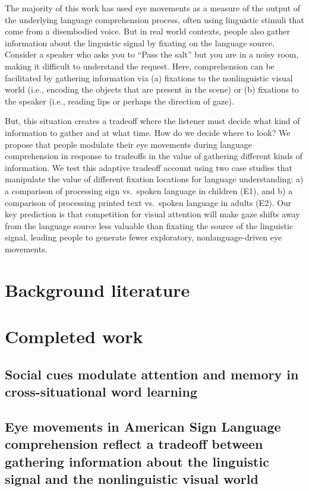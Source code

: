 \documentclass[]{elsarticle} %
\begin{document}
The majority of this work has used eye movements as a measure of the
output of the underlying language comprehension process, often using
linguistic stimuli that come from a disembodied voice. But in real world
contexts, people also gather information about the linguistic signal by
fixating on the language source. Consider a speaker who asks you to
``Pass the salt'' but you are in a noisy room, making it difficult to
understand the request. Here, comprehension can be facilitated by
gathering information via (a) fixations to the nonlinguistic visual
world (i.e., encoding the objects that are present in the scene) or (b)
fixations to the speaker (i.e., reading lips or perhaps the direction of
gaze).

But, this situation creates a tradeoff where the listener must decide
what kind of information to gather and at what time. How do we decide
where to look? We propose that people modulate their eye movements
during language comprehension in response to tradeoffs in the value of
gathering different kinds of information. We test this adaptive tradeoff
account using two case studies that manipulate the value of different
fixation locations for language understanding: a) a comparison of
processing sign vs.~spoken language in children (E1), and b) a
comparison of processing printed text vs.~spoken language in adults
(E2). Our key prediction is that competition for visual attention will
make gaze shifts away from the language source less valuable than
fixating the source of the linguistic signal, leading people to generate
fewer exploratory, nonlanguage-driven eye movements.

\section{Background literature}\label{background-literature}

\section{Completed work}\label{completed-work}

\subsection{Social cues modulate attention and memory in
cross-situational word
learning}\label{social-cues-modulate-attention-and-memory-in-cross-situational-word-learning}

\subsection{Eye movements in American Sign Language comprehension
reflect a tradeoff between gathering information about the linguistic
signal and the nonlinguistic visual
world}\label{eye-movements-in-american-sign-language-comprehension-reflect-a-tradeoff-between-gathering-information-about-the-linguistic-signal-and-the-nonlinguistic-visual-world}
\end{document}
